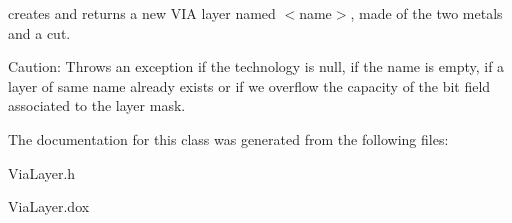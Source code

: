 creates and returns a new V\+IA layer named {\ttfamily $<$name$>$}, made of the two metals and a cut.

\begin{DoxyParagraph}{Caution\+: Throws an exception if the technology is null, if the name is }
empty, if a layer of same name already exists or if we overflow the capacity of the bit field associated to the layer mask. 
\end{DoxyParagraph}


The documentation for this class was generated from the following files\+:\begin{DoxyCompactItemize}
\item 
Via\+Layer.\+h\item 
Via\+Layer.\+dox\end{DoxyCompactItemize}

